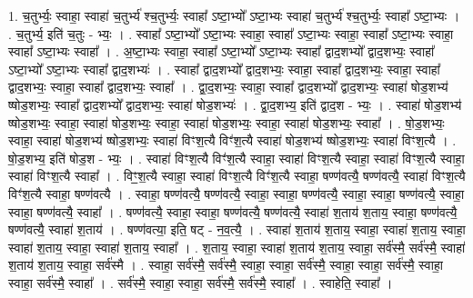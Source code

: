 \documentclass[17pt]{extarticle}
\begin{document}
1. च॒तुर्भ्यः॒ स्वाहा॒ स्वाहा॑ च॒तुर्भ्य॑ श्च॒तुर्भ्यः॒ स्वाहा᳚ ऽष्टा॒भ्यो᳚ ऽष्टा॒भ्यः स्वाहा॑ च॒तुर्भ्य॑ श्च॒तुर्भ्यः॒ स्वाहा᳚ ऽष्टा॒भ्यः । . च॒तुर्भ्य॒ इति॑ च॒तुः - भ्यः॒ । . स्वाहा᳚ ऽष्टा॒भ्यो᳚ ऽष्टा॒भ्यः स्वाहा॒ स्वाहा᳚ ऽष्टा॒भ्यः स्वाहा॒ स्वाहा᳚ ऽष्टा॒भ्यः स्वाहा॒ स्वाहा᳚ ऽष्टा॒भ्यः स्वाहा᳚ । . अ॒ष्टा॒भ्यः स्वाहा॒ स्वाहा᳚ ऽष्टा॒भ्यो᳚ ऽष्टा॒भ्यः स्वाहा᳚ द्वाद॒शभ्यो᳚ द्वाद॒शभ्यः॒ स्वाहा᳚ ऽष्टा॒भ्यो᳚ ऽष्टा॒भ्यः स्वाहा᳚ द्वाद॒शभ्यः॑ । . स्वाहा᳚ द्वाद॒शभ्यो᳚ द्वाद॒शभ्यः॒ स्वाहा॒ स्वाहा᳚ द्वाद॒शभ्यः॒ स्वाहा॒ स्वाहा᳚ द्वाद॒शभ्यः॒ स्वाहा॒ स्वाहा᳚ द्वाद॒शभ्यः॒ स्वाहा᳚ । . द्वा॒द॒शभ्यः॒ स्वाहा॒ स्वाहा᳚ द्वाद॒शभ्यो᳚ द्वाद॒शभ्यः॒ स्वाहा॑ षोड॒शभ्य॑ ष्षोड॒शभ्यः॒ स्वाहा᳚ द्वाद॒शभ्यो᳚ द्वाद॒शभ्यः॒ स्वाहा॑ षोड॒शभ्यः॑ । . द्वा॒द॒शभ्य॒ इति॑ द्वाद॒श - भ्यः॒ । . स्वाहा॑ षोड॒शभ्य॑ ष्षोड॒शभ्यः॒ स्वाहा॒ स्वाहा॑ षोड॒शभ्यः॒ स्वाहा॒ स्वाहा॑ षोड॒शभ्यः॒ स्वाहा॒ स्वाहा॑ षोड॒शभ्यः॒ स्वाहा᳚ । . षो॒ड॒शभ्यः॒ स्वाहा॒ स्वाहा॑ षोड॒शभ्य॑ ष्षोड॒शभ्यः॒ स्वाहा॑ विꣳश॒त्यै विꣳ॑श॒त्यै स्वाहा॑ षोड॒शभ्य॑ ष्षोड॒शभ्यः॒ स्वाहा॑ विꣳश॒त्यै । . षो॒ड॒शभ्य॒ इति॑ षोड॒श - भ्यः॒ । . स्वाहा॑ विꣳश॒त्यै विꣳ॑श॒त्यै स्वाहा॒ स्वाहा॑ विꣳश॒त्यै स्वाहा॒ स्वाहा॑ विꣳश॒त्यै स्वाहा॒ स्वाहा॑ विꣳश॒त्यै स्वाहा᳚ । . विꣳ॒॒श॒त्यै स्वाहा॒ स्वाहा॑ विꣳश॒त्यै विꣳ॑श॒त्यै स्वाहा॒ षण्ण॑वत्यै॒ षण्ण॑वत्यै॒ स्वाहा॑ विꣳश॒त्यै विꣳ॑श॒त्यै स्वाहा॒ षण्ण॑वत्यै । . स्वाहा॒ षण्ण॑वत्यै॒ षण्ण॑वत्यै॒ स्वाहा॒ स्वाहा॒ षण्ण॑वत्यै॒ स्वाहा॒ स्वाहा॒ षण्ण॑वत्यै॒ स्वाहा॒ स्वाहा॒ षण्ण॑वत्यै॒ स्वाहा᳚ । . षण्ण॑वत्यै॒ स्वाहा॒ स्वाहा॒ षण्ण॑वत्यै॒ षण्ण॑वत्यै॒ स्वाहा॑ श॒ताय॑ श॒ताय॒ स्वाहा॒ षण्ण॑वत्यै॒ षण्ण॑वत्यै॒ स्वाहा॑ श॒ताय॑ । . षण्ण॑वत्या॒ इति॒ षट् - न॒व॒त्यै॒ । . स्वाहा॑ श॒ताय॑ श॒ताय॒ स्वाहा॒ स्वाहा॑ श॒ताय॒ स्वाहा॒ स्वाहा॑ श॒ताय॒ स्वाहा॒ स्वाहा॑ श॒ताय॒ स्वाहा᳚ । . श॒ताय॒ स्वाहा॒ स्वाहा॑ श॒ताय॑ श॒ताय॒ स्वाहा॒ सर्व॑स्मै॒ सर्व॑स्मै॒ स्वाहा॑ श॒ताय॑ श॒ताय॒ स्वाहा॒ सर्व॑स्मै । . स्वाहा॒ सर्व॑स्मै॒ सर्व॑स्मै॒ स्वाहा॒ स्वाहा॒ सर्व॑स्मै॒ स्वाहा॒ स्वाहा॒ सर्व॑स्मै॒ स्वाहा॒ स्वाहा॒ सर्व॑स्मै॒ स्वाहा᳚ । . सर्व॑स्मै॒ स्वाहा॒ स्वाहा॒ सर्व॑स्मै॒ सर्व॑स्मै॒ स्वाहा᳚ । . स्वाहेति॒ स्वाहा᳚ । \newline
\pagebreak
{}
\end{document}

